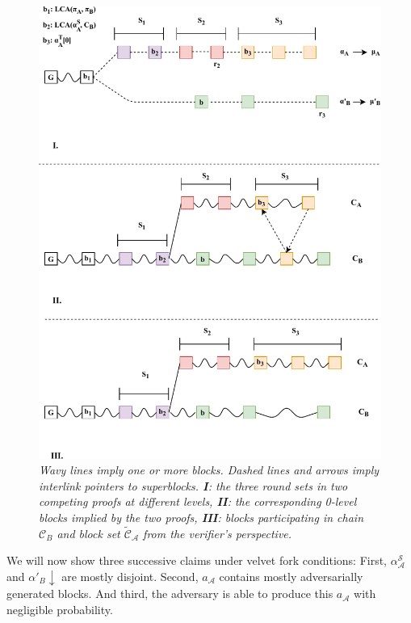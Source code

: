 \begin{figure}[h!]
	\begin{center}
    \includegraphics[scale=0.65]{figures/proof_velvet-crop.pdf}
	\end{center}
	\caption{\textit{ Wavy lines imply one or more blocks. Dashed lines and arrows imply
	interlink pointers to superblocks. \textbf{I}: the three round sets in two competing
	proofs at different levels, \textbf{II}: the corresponding 0-level blocks implied by the two proofs,
	\textbf{III}: blocks participating in chain $\mathcal{C}_B$ and block set $\widetilde{\mathcal{C}}_\mathcal{A}$ from the verifier's perspective.}}	
    \label{fig:proof_velvet}
\end{figure}

We will now show three successive claims under velvet fork conditions: First,
$\alpha^{\mathcal{S}}_\mathcal{A}$ and $\alpha'_B \downarrow$ are mostly
disjoint. Second, $a_\mathcal{A}$ contains mostly adversarially generated blocks. And third,
the adversary is able to produce this $a_\mathcal{A}$ with negligible probability.\\

